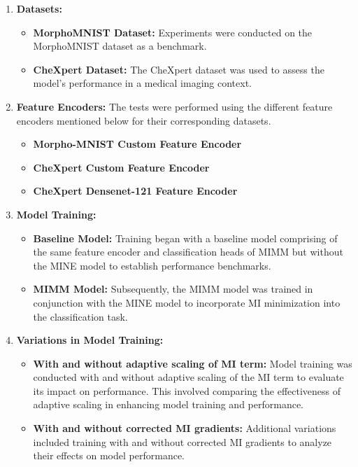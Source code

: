 \documentclass[12pt,DIV14,BCOR12mm,a4paper,footinclude=false,headinclude,parskip=half-,twoside,openright,cleardoublepage=empty,toc=index,bibliography=totoc,listof=totoc]{scrreprt}
\numberwithin{equation}{chapter}
\begin{document}
\begin{enumerate}
    \item \textbf{Datasets:}
    \begin{itemize}
        \item \textbf{MorphoMNIST Dataset:} Experiments were conducted on the MorphoMNIST dataset as a benchmark.
        \item \textbf{CheXpert Dataset:} The CheXpert dataset was used to assess the model's performance in a medical imaging context.
    \end{itemize}
    
    \item \textbf{Feature Encoders:}
    The tests were performed using the different feature encoders mentioned below for their corresponding datasets.
    \begin{itemize}
        \item \textbf{Morpho-MNIST Custom Feature Encoder}
        \item \textbf{CheXpert Custom Feature Encoder}
        \item \textbf{CheXpert Densenet-121 Feature Encoder}
    \end{itemize}
    
    \item \textbf{Model Training:}
    \begin{itemize}
        \item \textbf{Baseline Model:} Training began with a baseline model comprising of the same feature encoder and classification heads of MIMM but without the MINE model to establish performance benchmarks.
        
        \item \textbf{MIMM Model:} Subsequently, the MIMM model was trained in conjunction with the MINE model to incorporate MI minimization into the classification task.
    \end{itemize}
    
    \item \textbf{Variations in Model Training:}
    \begin{itemize}
        \item \textbf{With and without adaptive scaling of MI term:} Model training was conducted with and without adaptive scaling of the MI term to evaluate its impact on performance. This involved comparing the effectiveness of adaptive scaling in enhancing model training and performance.
        
        \item \textbf{With and without corrected MI gradients:} Additional variations included training with and without corrected MI gradients to analyze their effects on model performance.
    \end{itemize}
    
\end{enumerate}
\end{document}
